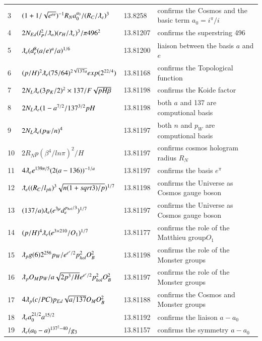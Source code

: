 \documentclass[a4paper,9pt]{article}
\begin{document}
\begin{appendix}
\begin{table}
\begin{tabular}{llll}
    3 & $ (1+1/\sqrt{e^{e e}})^{-1} R_N a_0^{a_0} / (R_C/\lambdabar_e)^3 $ & 13.8258 & confirms the Cosmos and the basic term $a_0 = i^\pi/i$ \\
  
  
  4 & $2N_{Ed}(l_P^2/\lambdabar_n) (r_H/\lambdabar_e)^3/ \pi 496^2 $ & 13.81207 & confirms the superstring 496\\
    5 & $ \lambdabar_{e} (d_e^8(a/e)^a/a)^{1/6}  $ & 13.81200 & liaison between the basis $a$ and $e$ \\
     6 & $ (p/H)^2\lambdabar_{e}(75/64)^{2\sqrt{137 a}}exp(2^{22/4})  $ & 13.81168 & confirms the Topological function \\
    7 & $2 N_L \lambdabar_{e} (3p_K/2)^2 \times 137/F\sqrt{pH\beta}  $ & 13.81198 & confirms the Koide factor \\
    8 & $2 N_L \lambdabar_{e} (1-a^{7/2}/137^{3/2}pH  $ & 13.81198 & both $a$ and 137 are computional basis \\
    9 & $2 N_L \lambdabar_{e} (p_W/n)^4  $ & 13.81197 & both $n$ and $p_W$ are computional basis \\
    10 & $ 2R_Np(\beta^4/ln\pi)^2/H $ & 13.81197 & confirms cosmos hologram radius $R_N$ \\
    11 & $4 \lambdabar_{e} e^{139\pi /5} (2(a-136))^{-1/a}  $ & 13.81197 & confirms the basis $e^\pi$ \\
    12 & $ \lambdabar_{e} ((R_C/l_{ph})^3 \sqrt{n(1+sqrt3)/p})^{1/7} $ & 13.81198 & confirms the Universe as Cosmos gauge boson \\
    13 & $ (137/a)\lambdabar_{e} (e^{3\mu}d_e^{p_{hol}/3} )^{1/7} $ & 13.81197 & confirms the Universe as Cosmos gauge boson \\
    14 & $ (p/H)^4 \lambdabar_{e} (e^{3\times 210}/O_1)^{1/7} $ & 13.81177 & confirms the role of the Matthieu group$ O_1$ \\
    15 & $ \lambdabar_{p} g(6) 2^{256} p_W /e^{e^{e}/2} p_{hol}^2 O_B^2 $ & 13.81198 & confirms the role of the Monster groups \\ 
    16 & $ \lambdabar_{p} O_M p_W /a \sqrt{2p^3/H} e^{e^{e}/2} p_{hol}^2 O_B^2 $ & 13.81197 & confirms the role of the Monster groups \\ 
    17 & $ 4 \lambdabar_{p} (c/PC) p_{Ed} \sqrt{a/137} O_M O_B^2 $ & 13.81188 & confirms the Cosmos and Monster groups \\   
    18 & $ \lambdabar_{e} a_0^{21/2} a^{15/2}   $ & 13.81192 & confirms the liaison $a-a_0$ \\
    19 & $ \lambdabar_{e}(a_0-a)^{137^2-40}/g_3   $ & 13.81157 & confirms the symmetry $a-a_0$ \\

\end{tabular}
\end{table}
\end{appendix}
\end{document}
